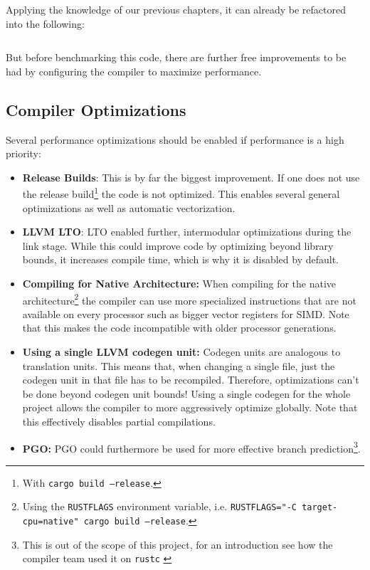 Applying the knowledge of our previous chapters, it can already be refactored into the following:

\begin{listing}[H]
  \inputminted{rust}{./assets/variadic_optimized.rs}
\caption{The code optimized analogously to chapter 2.}
\end{listing}

But before benchmarking this code, there are further free improvements to be had by configuring the compiler to maximize performance.

\subsection{Compiler Optimizations}
Several performance optimizations should be enabled if performance is a high priority:
\begin{itemize}
  \item \textbf{Release Builds}: This is by far the biggest improvement. If one does not use the release build\footnote{With \texttt{cargo build --release}.} the code is not optimized. This enables several general optimizations as well as automatic vectorization.
  \item \textbf{\ac{LLVM} \ac{LTO}}: \ac{LTO} enabled further, intermodular optimizations during the link stage. While this could improve code by optimizing beyond library bounds, it increases compile time, which is why it is disabled by default.
  \item \textbf{Compiling for Native Architecture:} When compiling for the native architecture\footnote{Using the \texttt{RUSTFLAGS} environment variable, i.e. \texttt{RUSTFLAGS="-C target-cpu=native" cargo build --release}.} the compiler can use more specialized instructions that are not available on every processor such as bigger vector registers for SIMD. Note that this makes the code incompatible with older processor generations.
  \item \textbf{Using a single \ac{LLVM} codegen unit:} Codegen units are analogous to translation units. This means that, when changing a single file, just the codegen unit in that file has to be recompiled. Therefore, optimizations can't be done beyond codegen unit bounds! Using a single codegen for the whole project allows the compiler to more aggressively optimize globally. Note that this effectively disables partial compilations.
  \item \textbf{\ac{PGO}:} \ac{PGO} could furthermore be used for more effective branch prediction\footnote{This is out of the scope of this project, for an introduction see how the compiler team used it on \texttt{rustc} \cite{pgo}}.
\end{itemize}

